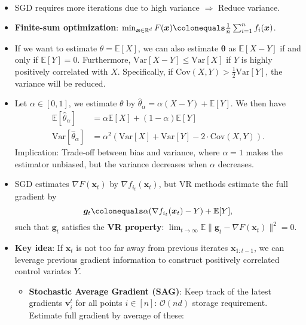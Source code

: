 \documentclass[8pt,a4paper]{extarticle}
\newcommand{\E}{\mathbb{E}}
\newcommand{\R}{\mathbb{R}}
\newcommand{\Var}{\mathrm{Var}}
\renewcommand{\vec}[1]{\bm{#1}}
\newenvironment{topic}[1]
{\textbf{\sffamily \colorbox{black}{\rlap{\textbf{\textcolor{white}{#1}}}\hspace{\linewidth}\hspace{-2\fboxsep}}} \\ \vspace{0.2cm}}
{}
\begin{document}
\begin{multicols*}{2}
    \begin{topic}{Variance reduction}
        \begin{itemize}
            \item SGD requires more iterations due to high variance $\Rightarrow$ Reduce variance.
            \item \textbf{Finite-sum optimization}: $\min_{\vec{x} \in \R^d} F(\vec{x}) \colonequals \frac{1}{n} \sum_{i=1}^{n} f_i(\vec{x})$.
            \item If we want to estimate $\theta = \E[X]$, we can also estimate $\vec{\theta}$ as $\E[X-Y]$ if and
                  only if $\E[Y] = 0$. Furthermore, $\Var[X-Y] \leq \Var[X]$ if $Y$ is highly positively correlated
                  with $X$. Specifically, if $\mathrm{Cov}(X, Y) > \frac{1}{2} \Var[Y]$, the variance will be
                  reduced.
            \item Let $\alpha \in [0,1]$, we estimate $\theta$ by $\hat{\theta}_{\alpha} = \alpha(X-Y) + \E[Y]$. We
                  then have
                  \begin{align*}
                      \E[\hat{\theta}_{\alpha}]   & = \alpha\E[X] + (1-\alpha)\E[Y]                             \\
                      \Var[\hat{\theta}_{\alpha}] & = \alpha^2 (\Var[X] + \Var[Y] - 2 \cdot \mathrm{Cov}(X,Y)).
                  \end{align*}
                  Implication: Trade-off between bias and variance, where $\alpha=1$ makes the estimator unbiased, but the variance decreases when $\alpha$ decreases.
            \item SGD estimates $\nabla F(\vec{x}_t)$ by $\nabla f_{i_t}(\vec{x}_t)$, but VR methods estimate the
                  full gradient by \[
                      \vec{g}_t \colonequals \alpha(\nabla f_{i_t}(\vec{x}_t) - Y) + \E[Y],
                  \]
                  such that $\vec{g}_t$ satisfies the \textbf{VR property}: $\lim_{t \to \infty} \E \| \vec{g}_t -
                      \nabla F(\vec{x}_t) \|^2 = 0$.
            \item \textbf{Key idea}: If $\vec{x}_t$ is not too far away from previous iterates
                  $\vec{x}_{1:t-1}$, we can leverage previous gradient information to construct
                  positively correlated control variates $Y$.
                  \begin{itemize}
                      \item \textbf{Stochastic Average Gradient (SAG)}: Keep track of the latest gradients $\vec{v}_i^t$ for all points $i \in [n]$: $\mathcal{O}(nd)$ storage requirement. Estimate full gradient by average of these: \[
\]
\end{itemize}
\end{itemize}
\end{topic}
\end{multicols*}
\end{document}
